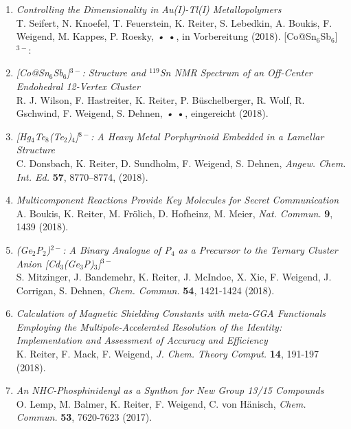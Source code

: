 \begin{enumerate}

\item \textit{Controlling the Dimensionality in Au(I)-Tl(I) Metallopolymers}\\
T. Seifert, N. Knoefel, T. Feuerstein, K. Reiter, S. Lebedkin, A. Boukis, F. Weigend, M. Kappes, P. Roesky, \textit{•} \textbf{•}, in Vorbereitung (2018).
[Co@Sn$_6$Sb$_6$]$^{3-}$:
\item \textit{[Co@Sn$_6$Sb$_6$]$^{3-}$: Structure and $^{119}$Sn NMR Spectrum of an Off-Center Endohedral 12-Vertex Cluster}\\
R. J. Wilson, F. Hastreiter, K. Reiter, P. Büschelberger, R. Wolf, R. Gschwind, F. Weigend, S. Dehnen, \textit{•} \textbf{•}, eingereicht (2018).

\item \textit{[Hg$_4$Te$_8$(Te$_2$)$_4$]$^{8-}$: A Heavy Metal Porphyrinoid Embedded in a Lamellar Structure}\\
C. Donsbach, K. Reiter, D. Sundholm, F. Weigend, S. Dehnen, \textit{Angew. Chem. Int. Ed.} \textbf{57}, 8770–8774, (2018).

\item \textit{Multicomponent Reactions Provide Key Molecules for Secret Communication}\\ 
A. Boukis, K. Reiter, M. Frölich, D. Hofheinz, M. Meier, \textit{Nat. Commun.} \textbf{9}, 1439 (2018).

\item \textit{(Ge$_2$P$_2$)$^{2-}$: A Binary Analogue of P$_4$ as a Precursor to the Ternary Cluster Anion [Cd$_3$(Ge$_3$P)$_3$]$^{3-}$}\\
S. Mitzinger, J. Bandemehr, K. Reiter, J. McIndoe, X. Xie, F. Weigend, J. Corrigan, S. Dehnen, \textit{Chem. Commun.} \textbf{54}, 1421-1424 (2018).

\item \textit{Calculation of Magnetic Shielding Constants with meta-GGA Functionals Employing the Multipole-Accelerated Resolution of the Identity: Implementation and Assessment of Accuracy and Efficiency}\\ 
K. Reiter, F. Mack, F. Weigend, \textit{J. Chem. Theory Comput.} \textbf{14}, 191-197 (2018).

\item \textit{An NHC-Phosphinidenyl as a Synthon for New Group 13/15 Compounds}\\
O. Lemp, M. Balmer, K. Reiter, F. Weigend, C. von Hänisch, \textit{Chem. Commun.} \textbf{53}, 7620-7623 (2017).


\end{enumerate}
